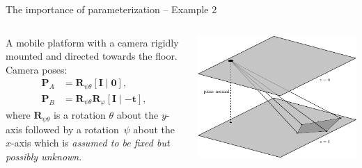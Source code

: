 \documentclass[aspectratio=169]{beamer}
\renewcommand{\phi}{\varphi}
\newcommand{\mat}[1]{\bm{#1}}
\begin{document}
\def\theimportanceTwoHeight{\vspace{4mm}}
\begin{frame}[t]{The importance of parameterization -- Example 2}
\begin{columns}
    \begin{column}{0.5\textwidth}
        \begin{minipage}[t][\textheight][t]{\textwidth}
        \theimportanceTwoHeight
        A mobile platform with a camera rigidly mounted and directed towards the floor.
        Camera poses:
        \begin{equation*}\label{paper03:eq:cammats}
        \begin{aligned}
            \mat{P}_A &= \mat{R}_{\psi\theta}[\mat{I}\;|\;\mat{0}],\\
            \mat{P}_B &= \mat{R}_{\psi\theta}\mat{R}_\phi[\mat{I}\;|\;{-\mat{t}}],
        \end{aligned}
        \end{equation*}
        where $\mat{R}_{\psi\theta}$ is a rotation $\theta$ about the $y$-axis followed by
        a rotation~$\psi$ about the $x$-axis which is \emph{assumed to be fixed but possibly unknown}.
        \end{minipage}
    \end{column}%
    \begin{column}{0.5\textwidth}
        \centering
        \includegraphics[width=\linewidth]{../lecture_notes/images/prob_geom1.pdf}
    \end{column}
\end{columns}
\end{frame}
\end{document}
